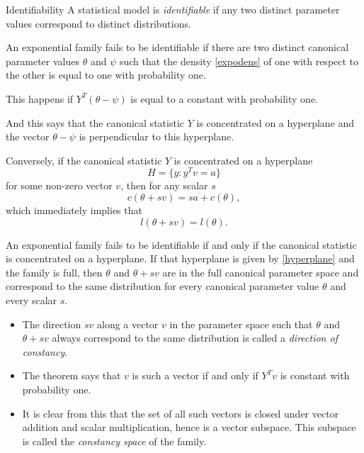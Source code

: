 \documentclass[
  ignorenonframetext,
]{beamer}
\providecommand{\tightlist}{%
  \setlength{\itemsep}{0pt}\setlength{\parskip}{0pt}}
\begin{document}
\begin{frame}{Identifiability}
\protect\hypertarget{identifiability}{}
A statistical model is \emph{identifiable} if any two distinct parameter
values correspond to distinct distributions.

An exponential family fails to be identifiable if there are two distinct
canonical parameter values \(\theta\) and \(\psi\) such that the density
\eqref{expodens} of one with respect to the other is equal to one with
probability one.

This happens if \(Y^T(\theta - \psi)\) is equal to a constant with
probability one.

And this says that the canonical statistic \(Y\) is concentrated on a
hyperplane and the vector \(\theta - \psi\) is perpendicular to this
hyperplane.
\end{frame}

\begin{frame}{}
\protect\hypertarget{section-3}{}
Conversely, if the canonical statistic \(Y\) is concentrated on a
hyperplane \begin{equation}\label{hyperplane}
  H = \{y : y^Tv = a\}  
\end{equation} for some non-zero vector \(v\), then for any scalar \(s\)
\[
  c(\theta + sv) = sa + c(\theta),
\] which immediately implies that \[
  l(\theta + sv) = l(\theta).
\]
\end{frame}

\begin{frame}{}
\protect\hypertarget{section-4}{}
\begin{thm}
An exponential family fails to be identifiable if and only if the canonical statistic is concentrated on a hyperplane. If that hyperplane is given by \eqref{hyperplane} and the family is full, then $\theta$ and $\theta+sv$ are in the full canonical parameter space and correspond to the same distribution for every canonical parameter value $\theta$ and every scalar $s$.     
\end{thm}

\begin{itemize}
\tightlist
\item
  The direction \(sv\) along a vector \(v\) in the parameter space such
  that \(\theta\) and \(\theta + sv\) always correspond to the same
  distribution is called a \emph{direction of constancy}.
\item
  The theorem says that \(v\) is such a vector if and only if \(Y^Tv\)
  is constant with probability one.
\item
  It is clear from this that the set of all such vectors is closed under
  vector addition and scalar multiplication, hence is a vector subspace.
  This subspace is called the \emph{constancy space} of the family.
\end{itemize}
\end{frame}
\end{document}
